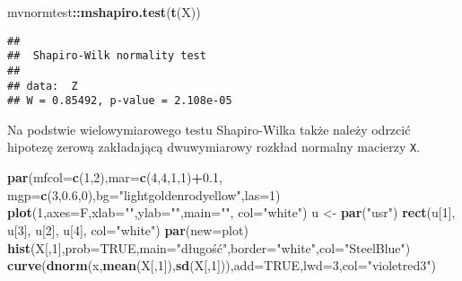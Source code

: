 \documentclass[polish,]{book}
\newenvironment{Shaded}{\begin{snugshade}}{\end{snugshade}}
\newcommand{\DataTypeTok}[1]{\textcolor[rgb]{0.13,0.29,0.53}{#1}}
\newcommand{\DecValTok}[1]{\textcolor[rgb]{0.00,0.00,0.81}{#1}}
\newcommand{\FloatTok}[1]{\textcolor[rgb]{0.00,0.00,0.81}{#1}}
\newcommand{\KeywordTok}[1]{\textcolor[rgb]{0.13,0.29,0.53}{\textbf{#1}}}
\newcommand{\NormalTok}[1]{#1}
\newcommand{\OperatorTok}[1]{\textcolor[rgb]{0.81,0.36,0.00}{\textbf{#1}}}
\newcommand{\OtherTok}[1]{\textcolor[rgb]{0.56,0.35,0.01}{#1}}
\newcommand{\StringTok}[1]{\textcolor[rgb]{0.31,0.60,0.02}{#1}}
\begin{document}
\begin{Shaded}
\begin{Highlighting}[]
\NormalTok{mvnormtest}\OperatorTok{::}\KeywordTok{mshapiro.test}\NormalTok{(}\KeywordTok{t}\NormalTok{(X))}
\end{Highlighting}
\end{Shaded}

\begin{verbatim}
## 
##  Shapiro-Wilk normality test
## 
## data:  Z
## W = 0.85492, p-value = 2.108e-05
\end{verbatim}

Na podstwie wielowymiarowego testu Shapiro-Wilka także należy odrzcić hipotezę
zerową zakładającą dwuwymiarowy rozkład normalny macierzy \texttt{X}.

\begin{Shaded}
\begin{Highlighting}[]
\KeywordTok{par}\NormalTok{(}\DataTypeTok{mfcol=}\KeywordTok{c}\NormalTok{(}\DecValTok{1}\NormalTok{,}\DecValTok{2}\NormalTok{),}\DataTypeTok{mar=}\KeywordTok{c}\NormalTok{(}\DecValTok{4}\NormalTok{,}\DecValTok{4}\NormalTok{,}\DecValTok{1}\NormalTok{,}\DecValTok{1}\NormalTok{)}\OperatorTok{+}\FloatTok{0.1}\NormalTok{, }\DataTypeTok{mgp=}\KeywordTok{c}\NormalTok{(}\DecValTok{3}\NormalTok{,}\FloatTok{0.6}\NormalTok{,}\DecValTok{0}\NormalTok{),}\DataTypeTok{bg=}\StringTok{"lightgoldenrodyellow"}\NormalTok{,}\DataTypeTok{las=}\DecValTok{1}\NormalTok{)}
\KeywordTok{plot}\NormalTok{(}\DecValTok{1}\NormalTok{,}\DataTypeTok{axes=}\NormalTok{F,}\DataTypeTok{xlab=}\StringTok{""}\NormalTok{,}\DataTypeTok{ylab=}\StringTok{""}\NormalTok{,}\DataTypeTok{main=}\StringTok{""}\NormalTok{, }\DataTypeTok{col=}\StringTok{"white"}\NormalTok{)}
\NormalTok{u <-}\StringTok{ }\KeywordTok{par}\NormalTok{(}\StringTok{"usr"}\NormalTok{)}
\KeywordTok{rect}\NormalTok{(u[}\DecValTok{1}\NormalTok{], u[}\DecValTok{3}\NormalTok{], u[}\DecValTok{2}\NormalTok{], u[}\DecValTok{4}\NormalTok{], }\DataTypeTok{col=}\StringTok{"white"}\NormalTok{)}
\KeywordTok{par}\NormalTok{(}\DataTypeTok{new=}\NormalTok{plot)}
\KeywordTok{hist}\NormalTok{(X[,}\DecValTok{1}\NormalTok{],}\DataTypeTok{prob=}\OtherTok{TRUE}\NormalTok{,}\DataTypeTok{main=}\StringTok{"długość"}\NormalTok{,}\DataTypeTok{border=}\StringTok{"white"}\NormalTok{,}\DataTypeTok{col=}\StringTok{"SteelBlue"}\NormalTok{)}
\KeywordTok{curve}\NormalTok{(}\KeywordTok{dnorm}\NormalTok{(x,}\KeywordTok{mean}\NormalTok{(X[,}\DecValTok{1}\NormalTok{]),}\KeywordTok{sd}\NormalTok{(X[,}\DecValTok{1}\NormalTok{])),}\DataTypeTok{add=}\OtherTok{TRUE}\NormalTok{,}\DataTypeTok{lwd=}\DecValTok{3}\NormalTok{,}\DataTypeTok{col=}\StringTok{"violetred3"}\NormalTok{)}

\end{Highlighting}
\end{Shaded}
\end{document}
